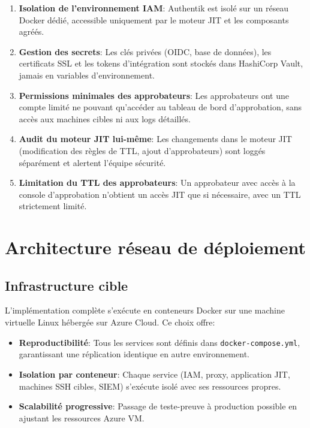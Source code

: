 \begin{enumerate}
	\item \textbf{Isolation de l'environnement IAM}: Authentik est isolé sur un réseau Docker dédié, accessible uniquement par le moteur JIT et les composants agréés.
	
	\item \textbf{Gestion des secrets}: Les clés privées (OIDC, base de données), les certificats SSL et les tokens d'intégration sont stockés dans HashiCorp Vault, jamais en variables d'environnement.
	
	\item \textbf{Permissions minimales des approbateurs}: Les approbateurs ont une compte limité ne pouvant qu'accéder au tableau de bord d'approbation, sans accès aux machines cibles ni aux logs détaillés.
	
	\item \textbf{Audit du moteur JIT lui-même}: Les changements dans le moteur JIT (modification des règles de TTL, ajout d'approbateurs) sont loggés séparément et alertent l'équipe sécurité.
	
	\item \textbf{Limitation du TTL des approbateurs}: Un approbateur avec accès à la console d'approbation n'obtient un accès JIT que si nécessaire, avec un TTL strictement limité.
\end{enumerate}

\section{Architecture réseau de déploiement}

\subsection{Infrastructure cible}

L'implémentation complète s'exécute en conteneurs Docker sur une machine virtuelle Linux hébergée sur Azure Cloud. Ce choix offre:

\begin{itemize}
	\item \textbf{Reproductibilité}: Tous les services sont définis dans \texttt{docker-compose.yml}, garantissant une réplication identique en autre environnement.
	
	\item \textbf{Isolation par conteneur}: Chaque service (IAM, proxy, application JIT, machines SSH cibles, SIEM) s'exécute isolé avec ses ressources propres.
	
	\item \textbf{Scalabilité progressive}: Passage de teste-preuve à production possible en ajustant les ressources Azure VM.
\end{itemize}

